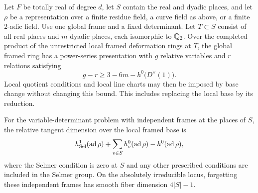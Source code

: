 \begin{proposition}\label{prop:relative-presentation}
Let $F$ be totally real of degree $d$, let $S$ contain the real and
dyadic places, and let $\rho$ be a representation over a finite
residue field, a curve field as above, or a finite $2$-adic field.
Use one global frame and a fixed determinant.  Let $T\subset S$
consist of all real places and $m$ dyadic places, each isomorphic to
$\mathbb Q_2$.  Over the completed product of the unrestricted local framed
deformation rings at $T$, the global framed ring has a power-series
presentation with $g$ relative variables and $r$ relations satisfying
\begin{equation}\label{eq:relative-one-frame}
g-r\ge 3-6m-h^0\bigl(D^\vee(1)\bigr).
\end{equation}
Local quotient conditions and local line charts may then be imposed
by base change without changing this bound.  This includes replacing
the local base by its reduction.

For the variable-determinant problem with independent frames at the
places of $S$, the relative tangent dimension over the local framed
base is
\begin{equation}\label{eq:relative-independent-frames}
h^1_{\mathrm{Sel}}(\operatorname{ad}\rho)
 +\sum_{v\in S}h^0_v(\operatorname{ad}\rho)-h^0(\operatorname{ad}\rho),
\end{equation}
where the Selmer condition is zero at $S$ and any other prescribed
conditions are included in the Selmer group.  On the absolutely
irreducible locus, forgetting these independent frames has smooth
fiber dimension $4|S|-1$.
\end{proposition}

